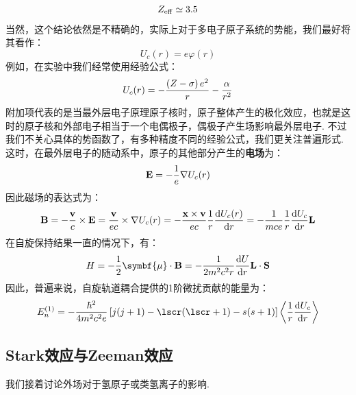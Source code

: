 \[
Z_{\mathrm{eff}} \simeq 3.5
\]
当然，这个结论依然是不精确的，实际上对于多电子原子系统的势能，我们最好将其看作：
\[
U_{c}(r) = e\varphi(r)
\]
例如，在实验中我们经常使用经验公式：
\[
U_{c}(r) = -\frac{\left({Z-\sigma}\right)e^{2}}{r} - \frac{\alpha}{r^{2}}
\]
附加项代表的是当最外层电子原理原子核时，原子整体产生的极化效应，也就是这时的原子核和外部电子相当于一个电偶极子，偶极子产生场影响最外层电子. 不过我们不关心具体的势函数了，有多种精度不同的经验公式，我们更关注普遍形式. 这时，在最外层电子的随动系中，原子的其他部分产生的\textbf{电场}为：
\[
\mathbf{E} = -\frac{1}{e}\nabla U_{c}(r)
\]
因此磁场的表达式为：
\[
\mathbf{B} = -\frac{\mathbf{v}}{c}\times\mathbf{E} = \frac{\mathbf{v}}{ec}\times\nabla U_{c}(r) = -\frac{\mathbf{x}\times\mathbf{v}}{ec}\frac{1}{r}\frac{\dd{U_{c}(r)}}{\dd{r}} = -\frac{1}{mce}\frac{1}{r}\frac{\dd{U_{c}}}{\dd{r}}\mathbf{L}
\]
在自旋保持结果一直的情况下，有：
\[
H = -\frac{1}{2}\symbf{\mu}\cdot\vB = -\frac{1}{2m^{2}c^{2}r}\de{U}{r}\vL\cdot\vS
\]
因此，普遍来说，自旋轨道耦合提供的1阶微扰贡献的能量为：
\[
E_{n}^{(1)} = -\frac{\hh^{2}}{4m^{2}c^{2}e}\mbr{j(j+1) - \lscr(\lscr+1) - s(s+1)}\avg{\frac{1}{r}\de{U_{c}}{r}}
\]
\subsection{Stark效应与Zeeman效应}
我们接着讨论外场对于氢原子或类氢离子的影响. 
